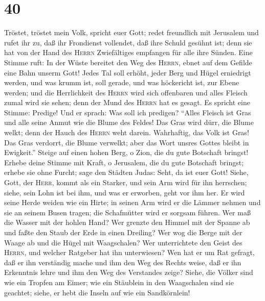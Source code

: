 \hypertarget{section-39}{%
\section{40}\label{section-39}}

 Tröstet, tröstet mein Volk, spricht euer Gott; redet
freundlich mit Jerusalem und rufet ihr zu,  daß ihr
Frondienst vollendet, daß ihre Schuld gesühnt ist; denn sie hat von der
Hand des \textsc{Herrn} Zwiefältiges empfangen für alle ihre Sünden.
 Eine Stimme ruft: In der Wüste bereitet den Weg des
\textsc{Herrn}, ebnet auf dem Gefilde eine Bahn unserm Gott!
 Jedes Tal soll erhöht, jeder Berg und Hügel erniedrigt
werden, und was krumm ist, soll gerade, und was höckericht ist, zur
Ebene werden;  und die Herrlichkeit des \textsc{Herrn}
wird sich offenbaren und alles Fleisch zumal wird sie sehen; denn der
Mund des \textsc{Herrn} hat es gesagt.  Es spricht eine
Stimme: Predige! Und er sprach: Was soll ich predigen? ``Alles Fleisch
ist Gras und alle seine Anmut wie die Blume des Feldes! 
Das Gras wird dürr, die Blume welkt; denn der Hauch des \textsc{Herrn}
weht darein. Wahrhaftig, das Volk ist Gras!  Das Gras
verdorrt, die Blume verwelkt; aber das Wort unsres Gottes bleibt in
Ewigkeit.''  Steige auf einen hohen Berg, o Zion, die du
gute Botschaft bringst! Erhebe deine Stimme mit Kraft, o Jerusalem, die
du gute Botschaft bringst; erhebe sie ohne Furcht; sage den Städten
Judas: Seht, da ist euer Gott!  Siehe, Gott, der
\textsc{Herr}, kommt als ein Starker, und sein Arm wird für ihn
herrschen; siehe, sein Lohn ist bei ihm, und was er erworben, geht vor
ihm her.  Er wird seine Herde weiden wie ein Hirte; in
seinen Arm wird er die Lämmer nehmen und sie an seinem Busen tragen; die
Schafmütter wird er sorgsam führen.  Wer maß die Wasser
mit der hohlen Hand? Wer grenzte den Himmel mit der Spanne ab und faßte
den Staub der Erde in einen Dreiling? Wer wog die Berge mit der Waage ab
und die Hügel mit Waagschalen?  Wer unterrichtete den
Geist des \textsc{Herrn}, und welcher Ratgeber hat ihn unterwiesen?
 Wen hat er um Rat gefragt, daß er ihn verständig mache
und ihm den Weg des Rechts weise, daß er ihn Erkenntnis lehre und ihm
den Weg des Verstandes zeige?  Siehe, die Völker sind wie
ein Tropfen am Eimer; wie ein Stäublein in den Waagschalen sind sie
geachtet; siehe, er hebt die Inseln auf wie ein Sandkörnlein!
